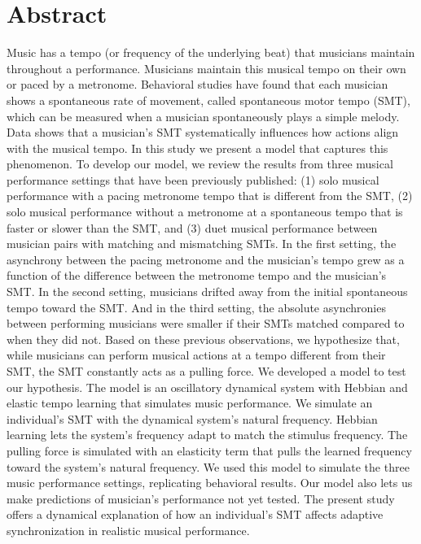 \documentclass{report}
\begin{document}
\section{Abstract}
Music has a tempo (or frequency of the underlying beat) that musicians maintain throughout a performance. Musicians maintain this musical tempo on their own or paced by a metronome. Behavioral studies have found that each musician shows a spontaneous rate of movement, called spontaneous motor tempo (SMT), which can be measured when a musician spontaneously plays a simple melody. Data shows that a musician's SMT systematically influences how actions align with the musical tempo. In this study we present a model that captures this phenomenon. To develop our model, we review the results from three musical performance settings that have been previously published: (1) solo musical performance with a pacing metronome tempo that is different from the SMT, (2) solo musical performance without a metronome at a spontaneous tempo that is faster or slower than the SMT, and (3) duet musical performance between musician pairs with matching and mismatching SMTs. In the first setting, the asynchrony between the pacing metronome and the musician's tempo grew as a function of the difference between the metronome tempo and the musician's SMT. In the second setting, musicians drifted away from the initial spontaneous tempo toward the SMT. And in the third setting, the absolute asynchronies between performing musicians were smaller if their SMTs matched compared to when they did not. Based on these previous observations, we hypothesize that, while musicians can perform musical actions at a tempo different from their SMT, the SMT constantly acts as a pulling force. We developed a model to test our hypothesis. The model is an oscillatory dynamical system with Hebbian and elastic tempo learning that simulates music performance. We simulate an individual's SMT with the dynamical system's natural frequency. Hebbian learning lets the system's frequency adapt to match the stimulus frequency. The pulling force is simulated with an elasticity term that pulls the learned frequency toward the system's natural frequency. We used this model to simulate the three music performance settings, replicating behavioral results. Our model also lets us make predictions of musician's performance not yet tested. The present study offers a dynamical explanation of how an individual's SMT affects adaptive synchronization in realistic musical performance.
\end{document}

